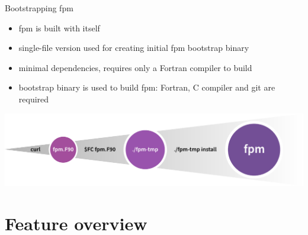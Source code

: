 \documentclass[lualatex,10pt,aspectratio=169]{beamer}
\begin{document}
\begin{frame}{Bootstrapping fpm}
   \begin{itemize}
      \item fpm is built with itself
      \item single-file version used for creating initial fpm bootstrap binary
      \item minimal dependencies, requires only a Fortran compiler to build
      \item bootstrap binary is used to build fpm: Fortran, C compiler and git are required
   \end{itemize}
   \vfill

   \centering
   \includegraphics[width=.9\textwidth]{Figures/bootstrapping.pdf}
\end{frame}


\section{Feature overview}
\end{document}
